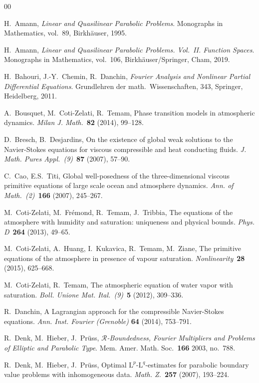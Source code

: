 \documentclass[10pt]{amsart}
\theoremstyle{plain}
\theoremstyle{definition}
\theoremstyle{thm}
\numberwithin{equation}{section}
\newcommand{\rL}{\mathrm{L}}
\newcommand{\rLq}{\rL^q}
\newcommand{\rLp}{\rL^p}
\begin{document}
\begin{thebibliography}{00}

H.~Amann,
{\it Linear and Quasilinear Parabolic Problems}. Monographs in Mathematics, vol.~89, Birkh\"auser, 1995.
			
H.~Amann,
{\it Linear and Quasilinear Parabolic Problems. Vol.~II. Function Spaces}. Monographs in Mathematics, vol.~106, Birkh\"auser/Springer, Cham, 2019.

H.~Bahouri, J.-Y.~Chemin, R.~Danchin, 
{\it Fourier Analysis and Nonlinear Partial Differential Equations}.
{Grundlehren der math.~Wissenschaften, 343}, Springer, Heidelberg, 2011.

A.~Bousquet, M.~Coti-Zelati, R.~Temam, 
Phase transition models in atmospheric dynamics.
{\it Milan J. Math.}~{\bf 82} (2014), 99--128.

D.~Bresch, B.~Desjardins, 
On the existence of global weak solutions to the Navier-Stokes equations for viscous compressible and heat conducting fluids.
{\it J. Math. Pures Appl.~(9)}~{\bf 87} (2007), 57--90.

C.~Cao, E.S.~Titi, 
Global well-posedness of the three-dimensional viscous primitive equations of large scale ocean and atmosphere dynamics.
{\it Ann. of Math.~(2)}~{\bf 166} (2007), 245--267.

M.~Coti-Zelati, M.~Fr\'emond, R.~Temam, J.~Tribbia,
The equations of the atmosphere with humidity and saturation: uniqueness and physical bounds.
{\it Phys. D}~{\bf 264} (2013), 49--65.

M.~Coti-Zelati, A.~Huang, I.~Kukavica, R.~Temam, M.~Ziane,
The primitive equations of the atmosphere in presence of vapour saturation.
{\it Nonlinearity}~{\bf 28} (2015), 625--668.

M.~Coti-Zelati, R.~Temam,
The atmospheric equation of water vapor with saturation.
{\it Boll. Unione Mat. Ital.~(9)}~{\bf 5} (2012), 309--336.

R.~Danchin,
A Lagrangian approach for the compressible Navier-Stokes equations.
{\it Ann. Inst. Fourier (Grenoble)} {\bf 64} (2014), 753--791.

R.~Denk, M.~Hieber, J.~Pr\"uss,
{\it $\mathcal{R}$-Boundedness, Fourier Multipliers and Problems of Elliptic and Parabolic Type}. 
{Mem. Amer. Math. Soc.}~{\bf 166} 2003, no.~788.

R.~Denk, M.~Hieber, J.~Pr\"uss, 
Optimal $\rLp$-$\rLq$-estimates for parabolic boundary value problems with inhomogeneous data.
{\it Math. Z.}~{\bf 257} (2007), 193--224.


\end{thebibliography}
\end{document}
